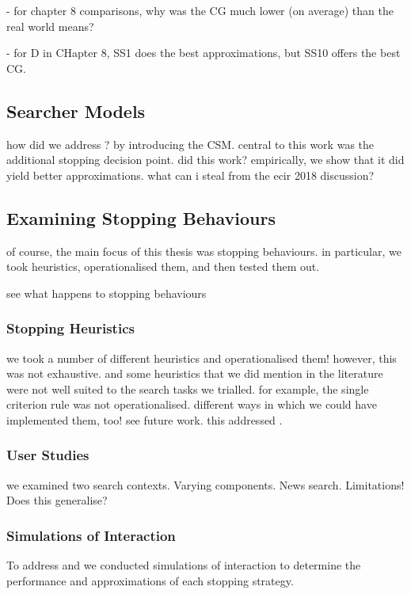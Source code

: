 - for chapter 8 comparisons, why was the CG much lower (on average) than the real world means?

- for D in CHapter 8, SS1 does the best approximations, but SS10 offers the best CG.

\subsection{Searcher Models}

how did we address ? by introducing the CSM.
central to this work was the additional stopping decision point.
did this work?
empirically, we show that it did yield better approximations.
what can i steal from the ecir 2018 discussion?

\subsection{Examining Stopping Behaviours}

of course, the main focus of this thesis was stopping behaviours.
in particular, we took heuristics, operationalised them, and then tested them out.

see what happens to stopping behaviours 

\subsubsection{Stopping Heuristics}
we took a number of different heuristics and operationalised them!
however, this was not exhaustive.
and some heuristics that we did mention in the literature were not well suited to the search tasks we trialled.
for example, the single criterion rule was not operationalised.
different ways in which we could have implemented them, too! see future work.
this addressed .

\subsubsection{User Studies}
we examined two search contexts. Varying components. News search. Limitations! Does this generalise?

\subsubsection{Simulations of Interaction}
To address  and  we conducted simulations of interaction to determine the performance and approximations of each stopping strategy. 


